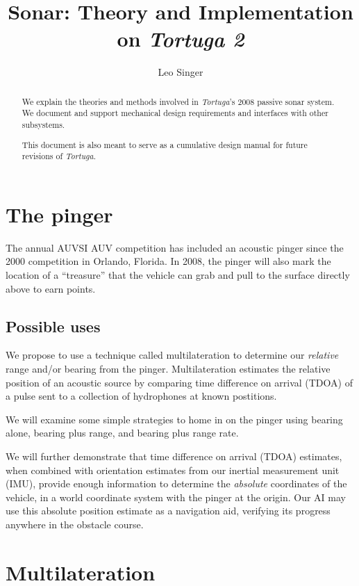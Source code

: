 \documentclass[10pt]{article}
\title{Sonar: Theory and Implementation on \textit{Tortuga 2}}
\author{Leo Singer}
\begin{document}
\maketitle

\begin{abstract}
We explain the theories and methods involved in \textit{Tortuga}'s 2008 passive sonar system.  We document and support mechanical design requirements and interfaces with other subsystems.

This document is also meant to serve as a cumulative design manual for future revisions of \textit{Tortuga}.
\end{abstract}

\tableofcontents

\clearpage

\section{The pinger}

The annual AUVSI AUV competition has included an acoustic pinger since the 2000 competition in Orlando, Florida.  In 2008, the pinger will also mark the location of a ``treasure'' that the vehicle can grab and pull to the surface directly above to earn points.

\subsection{Possible uses}

We propose to use a technique called multilateration to determine our \emph{relative} range and/or bearing from the pinger.  Multilateration estimates the relative position of an acoustic source by comparing time difference on arrival (TDOA) of a pulse sent to a collection of hydrophones at known postitions.

We will examine some simple strategies to home in on the pinger using bearing alone, bearing plus range, and bearing plus range rate.

We will further demonstrate that time difference on arrival (TDOA) estimates, when combined with orientation estimates from our inertial measurement unit (IMU), provide enough information to determine the \emph{absolute} coordinates of the vehicle, in a world coordinate system with the pinger at the origin.  Our AI may use this absolute position estimate as a navigation aid, verifying its progress anywhere in the obstacle course.

\section{Multilateration}
\end{document}
